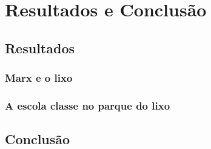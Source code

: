 \chapter{Resultados e Conclusão}

\section{Resultados}

\subsection{Marx e o lixo}

\subsection{A escola classe no parque do lixo}

\section{Conclusão}
